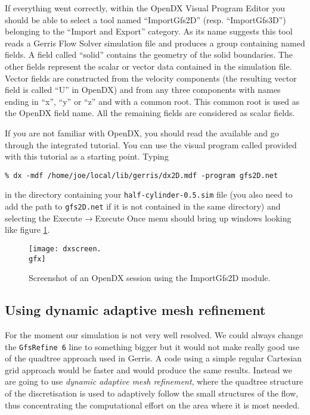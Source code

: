 \documentclass[a4paper]{article}
\begin{document}
If everything went correctly, within the OpenDX Visual Program Editor
you should be able to select a tool named ``ImportGfs2D''
(resp. ``ImportGfs3D'') belonging to the ``Import and Export''
category. As its name suggests this tool reads a Gerris Flow Solver
simulation file and produces a group containing named fields. A field
called ``solid'' contains the geometry of the solid boundaries. The
other fields represent the scalar or vector data contained in the
simulation file. Vector fields are constructed from the velocity
components (the resulting vector field is called ``U'' in OpenDX) and
from any three components with names ending in ``x'', ``y'' or ``z''
and with a common root. This common root is used as the OpenDX field
name. All the remaining fields are considered as scalar fields.

If you are not familiar with OpenDX, you should read the available
and go through the integrated tutorial. You can use the visual program
called  provided with this tutorial
as a starting point. Typing
\begin{verbatim}
% dx -mdf /home/joe/local/lib/gerris/dx2D.mdf -program gfs2D.net
\end{verbatim}
in the directory containing your {\tt half-cylinder-0.5.sim} file (you
also need to add the path to {\tt gfs2D.net} if it is not contained in
the same directory) and selecting the Execute$\rightarrow$Execute Once
menu should bring up windows looking like figure \ref{dx-screen}.
\begin{figure}[htbp]
\begin{center}
\texttt{[image: dxscreen.\\gfx]}
\end{center}
\caption{Screenshot of an OpenDX session using the ImportGfs2D module.}
\label{dx-screen}
\end{figure}

\subsection{Using dynamic adaptive mesh refinement}

For the moment our simulation is not very well resolved. We could always 
change the {\tt GfsRefine 6} line to something bigger but it would not
make really good use of the quadtree approach used in Gerris. A code
using a simple regular Cartesian grid approach would be faster and
would produce the same results. Instead we are going to use {\em
dynamic adaptive mesh refinement}, where the quadtree structure of the 
discretisation is used to adaptively follow the small structures of
the flow, thus concentrating the computational effort on the area
where it is most needed. 
\end{document}
